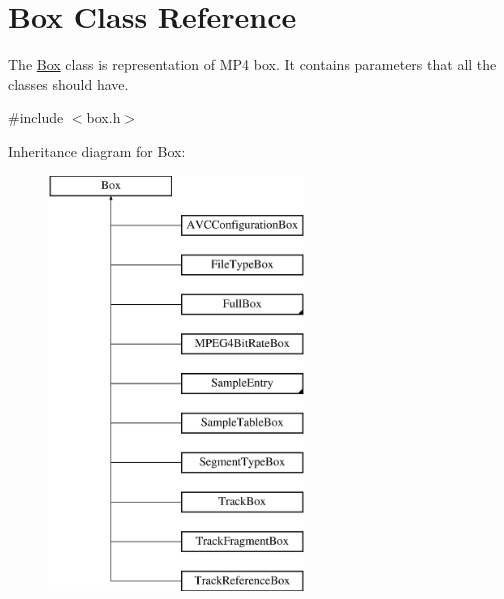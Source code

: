 \hypertarget{class_box}{\section{Box Class Reference}
\label{class_box}
}


The \hyperlink{class_box}{Box} class is representation of M\-P4 box. It contains parameters that all the classes should have.  




{\ttfamily \#include $<$box.\-h$>$}

Inheritance diagram for Box\-:\begin{figure}[H]
\begin{center}
\leavevmode
\includegraphics[height=11.000000cm]{class_box}
\end{center}
\end{figure}
